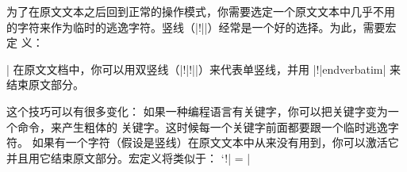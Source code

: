 
为了在原文文本之后回到正常的操作模式，你需要选定一个原文文本中几乎不用
的字符来作为临时的逃逸字符。竖线（|!||）经常是一个好的选择。为此，需要宏定
义：
\csdisplay
\def\verbatim{\par\begingroup\deactivate\obeywhitespace
   \catcode `\!| = 0 %
}

\def\endverbatim{\endgroup\endpar}

\def\!|{!|}
|
在原文文档中，你可以用双竖线（|!|!||）来代表单竖线，并用
|!|endverbatim| 来结束原文部分。

这个技巧可以有很多变化：
\ulist
\li 如果一种编程语言有关键字，你可以把关键字变为一个命令，来产生粗体的
关键字。这时候每一个关键字前面都要跟一个临时逃逸字符。
\li 如果有一个字符（假设是竖线）在原文文本中从来没有用到，你可以激活它
并且用它结束原文部分。宏定义将类似于：
\csdisplay
{\catcode `\!| = \active
\gdef\verbatim{%
   \par\begingroup\deactivate\obeywhitespace
   \catcode `!| = \active
   \def !|{\endgroup\par}%
}}
|
\endulist



